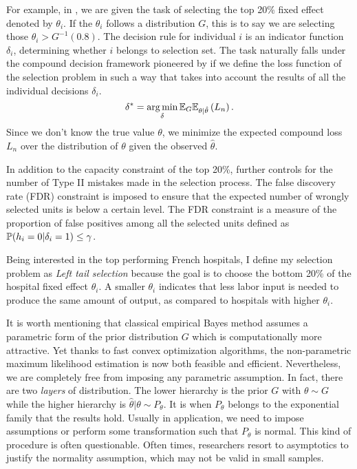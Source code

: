 \documentclass[12pt]{article}
\begin{document}
For example, in \cite{gu2023invidious}, we are given the task of selecting the
top 20\% fixed effect denoted by $\theta_i$. If the $\theta_i$ follows a
distribution $G$, this is to say we are selecting those $\theta_i>G^{-1}(0.8)$.
The decision rule for individual $i$ is an indicator function $\delta_i$,
determining whether $i$ belongs to selection set. The task naturally falls
under the compound decision framework pioneered by \cite{herbert1956empirical}
if we define the loss function of the selection problem in such a way that
takes into account the results of all the individual decisions $\delta_i$.
\begin{equation*}
    \delta^* = \operatorname*{arg\,min}_{\delta} \mathbb{E}_G\mathbb{E}_{\theta|\hat{\theta}}\left(L_n\right).
\end{equation*}
Since we don't know the true value $\theta$, we minimize the expected compound loss  $L_n$ over the distribution of $\theta$ given the observed $\hat{\theta}$.

In addition to the capacity constraint of the top 20\%, \citet{gu2023invidious}
further controls for the number of Type II mistakes made in the selection
process. The false discovery rate (FDR) constraint is imposed to ensure that
the expected number of wrongly selected units is below a certain level. The FDR
constraint is a measure of the proportion of false positives among all the
selected units defined as $\mathbb{P}(h_i=0|\delta_i=1)\le \gamma$.

Being interested in the top performing French hospitals, I define my selection
problem as \textit{Left tail selection} because the goal is to choose the
bottom 20\% of the hospital fixed effect $\theta_i$. A smaller $\theta_i$
indicates that less labor input is needed to produce the same amount of output,
as compared to hospitals with higher $\theta_i$.

It is worth mentioning that classical empirical Bayes method assumes a
parametric form of the prior distribution $G$ which is computationally more
attractive. Yet thanks to fast convex optimization algorithms, the
non-parametric maximum likelihood estimation is now both feasible and
efficient. Nevertheless, we are completely free from imposing any parametric
assumption. In fact, there are two \textit{layers} of distribution. The lower
hierarchy is the prior $G$ with $\theta\sim G$ while the higher hierarchy is
$\hat{\theta}|\theta \sim P_{\theta}$. It is when $P_{\theta}$ belongs to the
exponential family that the \citet{lindsay1995mixture} results hold. Usually in
application, we need to impose assumptions or perform some transformation such
that $P_{\theta}$ is normal. This kind of procedure is often questionable.
Often times, researchers resort to asymptotics to justify the normality
assumption, which may not be valid in small samples.
\end{document}
